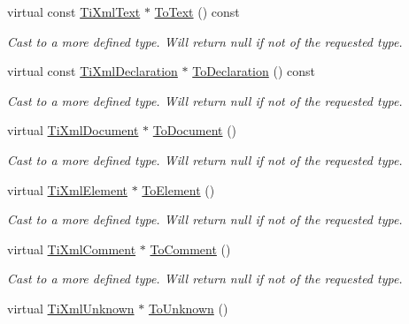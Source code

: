 \begin{DoxyCompactItemize}
virtual const \hyperlink{class_ti_xml_text}{TiXmlText} $\ast$ \hyperlink{class_ti_xml_node_a95a46a52c525992d6b4ee08beb14cd69}{ToText} () const 
\begin{DoxyCompactList}\small\item\em Cast to a more defined type. Will return null if not of the requested type. \item\end{DoxyCompactList}\item 
virtual const \hyperlink{class_ti_xml_declaration}{TiXmlDeclaration} $\ast$ \hyperlink{class_ti_xml_node_a9f43e6984fc7d4afd6eb32714c6b7b72}{ToDeclaration} () const 
\begin{DoxyCompactList}\small\item\em Cast to a more defined type. Will return null if not of the requested type. \item\end{DoxyCompactList}\item 
virtual \hyperlink{class_ti_xml_document}{TiXmlDocument} $\ast$ \hyperlink{class_ti_xml_node_a6a4c8ac28ee7a745d059db6691e03bae}{ToDocument} ()
\begin{DoxyCompactList}\small\item\em Cast to a more defined type. Will return null if not of the requested type. \item\end{DoxyCompactList}\item 
virtual \hyperlink{class_ti_xml_element}{TiXmlElement} $\ast$ \hyperlink{class_ti_xml_node_aa65d000223187d22a4dcebd7479e9ebc}{ToElement} ()
\begin{DoxyCompactList}\small\item\em Cast to a more defined type. Will return null if not of the requested type. \item\end{DoxyCompactList}\item 
virtual \hyperlink{class_ti_xml_comment}{TiXmlComment} $\ast$ \hyperlink{class_ti_xml_node_a383e06a0787f7063953934867990f849}{ToComment} ()
\begin{DoxyCompactList}\small\item\em Cast to a more defined type. Will return null if not of the requested type. \item\end{DoxyCompactList}\item 
virtual \hyperlink{class_ti_xml_unknown}{TiXmlUnknown} $\ast$ \hyperlink{class_ti_xml_node_a06de5af852668c7e4af0d09c205f0b0d}{ToUnknown} ()

\end{DoxyCompactItemize}
